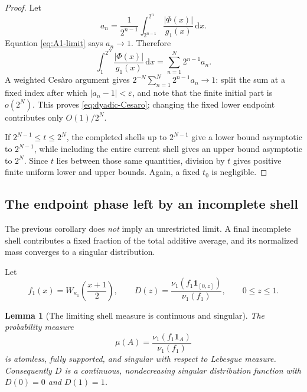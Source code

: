 \documentclass[11pt,oneside]{article}
\numberwithin{equation}{section}
\newtheorem{lemma}[theorem]{Lemma}
\theoremstyle{definition}
\theoremstyle{remark}
\newcommand{\dd}{\,\mathrm d}
\newcommand{\abs}[1]{\left|#1\right|}
\newcommand{\ind}{\mathbf 1}
\newcommand{\PhiUp}{\Phi}
\begin{document}
\begin{proof}
Let
\[
 a_n=\frac1{2^{n-1}}\int_{2^{n-1}}^{2^n}
 \frac{\abs{\PhiUp(x)}}{g_1(x)}\dd x.
\]
Equation \eqref{eq:A1-limit} says \(a_n\to1\).  Therefore
\[
 \int_{1}^{2^N}\frac{\abs{\PhiUp(x)}}{g_1(x)}\dd x
 =\sum_{n=1}^{N}2^{n-1}a_n.
\]
A weighted Ces\`aro argument gives
\(
 2^{-N}\sum_{n=1}^{N}2^{n-1}a_n\to1
\): split the sum at a fixed index after which \(|a_n-1|<\varepsilon\), and note that the
finite initial part is \(o(2^N)\).  This proves \eqref{eq:dyadic-Cesaro}; changing the fixed
lower endpoint contributes only \(O(1)/2^N\).

If \(2^{N-1}\le t\le2^N\), the completed shells up to \(2^{N-1}\) give a lower bound
asymptotic to \(2^{N-1}\), while including the entire current shell gives an upper bound
asymptotic to \(2^N\).  Since \(t\) lies between those same quantities, division by \(t\)
gives positive finite uniform lower and upper bounds.  Again, a fixed \(t_0\) is negligible.
\end{proof}

\subsection{The endpoint phase left by an incomplete shell}

The previous corollary does \emph{not} imply an unrestricted limit.  A final incomplete
shell contributes a fixed fraction of the total additive average, and its normalized mass
converges to a singular distribution.

Let
\begin{equation}
 f_1(x)=W_{\kappa_1}\!\left(\frac{x+1}{2}\right),
 \qquad
 D(z)=\frac{\nu_1(f_1\ind_{[0,z]})}{\nu_1(f_1)},
 \qquad 0\le z\le1.
 \label{eq:D-def}
\end{equation}

\begin{lemma}[The limiting shell measure is continuous and singular]
\label{lem:singular-measure}
The probability measure
\begin{equation}
 \mu(A)=\frac{\nu_1(f_1\ind_A)}{\nu_1(f_1)}
 \label{eq:mu-def}
\end{equation}
is atomless, fully supported, and singular with respect to Lebesgue measure.  Consequently
\(D\) is a continuous, nondecreasing singular distribution function with
\(D(0)=0\) and \(D(1)=1\).
\end{lemma}
\end{document}
